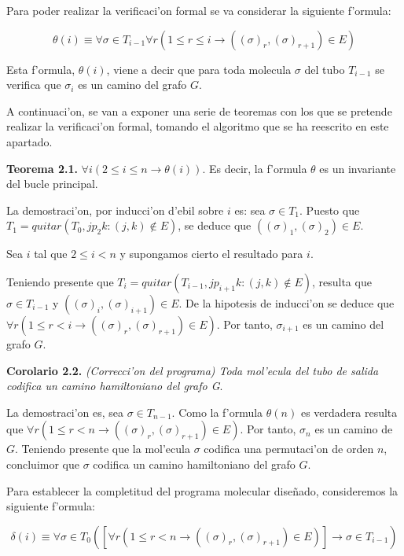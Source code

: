 \documentclass[12pt]{article}
\begin{document}
Para poder realizar la verificaci'on formal se va considerar la siguiente f'ormula:

\begin{equation*}
  \theta(i) \equiv \forall \sigma \in T_{i-1} \forall r (1 \leq r \leq i \longrightarrow ((\sigma)_{r},(\sigma)_{r+1}) \in E)
\end{equation*}

Esta f'ormula, $\theta(i)$, viene a decir que para toda molecula $\sigma$ del tubo $T_{i-1}$ se verifica que
$\sigma_{i}$ es un camino del grafo $G$.

A continuaci'on, se van a exponer una serie de teoremas con los que se pretende realizar la verificaci'on formal,
tomando el algoritmo que se ha reescrito en este apartado.

\textbf{Teorema 2.1.} $\forall i (2 \leq i \leq n \longrightarrow \theta(i))$. Es decir, la f'ormula $\theta$ es un invariante del
bucle principal.

La demostraci'on, por inducci'on d'ebil sobre $i$ es: sea $\sigma \in T_{1}$. Puesto que
$T_{1} = quitar(T_{0}, {jp_{2}k : (j,k) \notin E})$, se deduce que $((\sigma)_{1},(\sigma)_{2}) \in E$.

Sea $i$ tal que $2 \leq i < n$ y supongamos cierto el resultado para $i$.

Teniendo presente que $T_{i} = quitar(T_{i-1}, {jp_{i+1}k : (j,k) \notin E})$, resulta que
$\sigma \in T_{i-1}$ y $((\sigma)_{i},(\sigma)_{i+1}) \in E$. De la hipotesis de inducci'on se deduce que
$\forall r (1 \leq r < i \longrightarrow ((\sigma)_{r},(\sigma)_{r+1}) \in E)$. Por tanto, $\sigma_{i+1}$ es un camino del grafo $G$.

\textbf{Corolario 2.2.} \textit{(Correcci'on del programa) Toda mol'ecula del tubo de salida codifica un camino hamiltoniano
del grafo G}.

La demostraci'on es, sea $\sigma \in T_{n-1}$. Como la f'ormula $\theta(n)$ es verdadera resulta que
$\forall r (1 \leq r < n \longrightarrow ((\sigma)_{r},(\sigma)_{r+1}) \in E)$. Por tanto, $\sigma_{n}$ es un camino de $G$.
Teniendo presente que la mol'ecula $\sigma$ codifica una permutaci'on de orden $n$, concluimor que $\sigma$ codifica
un camino hamiltoniano del grafo $G$.

Para establecer la completitud del programa molecular diseñado, consideremos la siguiente f'ormula:

\begin{equation*}
  \delta(i) \equiv \forall \sigma \in T_{0} ([\forall r (1 \leq r < n \longrightarrow ((\sigma)_{r},(\sigma)_{r+1})
   \in E)] \longrightarrow \sigma \in T_{i-1})
\end{equation*}
\end{document}
